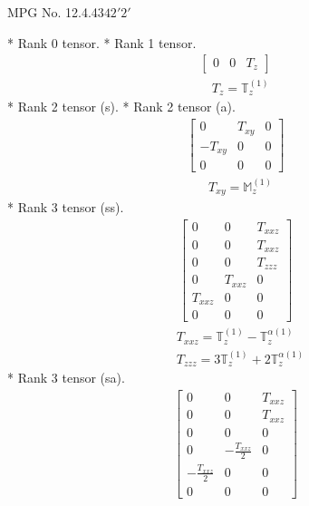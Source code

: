 \documentclass[fleqn,8pt,landscape]{jsarticle}
\begin{document}
\setcounter{MaxMatrixCols}{32}

\renewcommand{\tablename}{Table~}
\renewcommand{\figurename}{Figure~}
\begin{center}
\LARGE
MPG No. 12.4.43\quad$42'2'$
\end{center}
* Rank 0 tensor.
* Rank 1 tensor.
\begin{align*}
\begin{bmatrix} 0 & 0 & T_{z} \end{bmatrix}
\end{align*}
\begin{align*}
& T_{z} = \mathbb{T}_{z}^{(1)}
\end{align*}
* Rank 2 tensor (s).
* Rank 2 tensor (a).
\begin{align*}
\begin{bmatrix} 0 & T_{xy} & 0 \\ - T_{xy} & 0 & 0 \\ 0 & 0 & 0 \end{bmatrix}
\end{align*}
\begin{align*}
& T_{xy} = \mathbb{M}_{z}^{(1)}
\end{align*}
* Rank 3 tensor (ss).
\begin{align*}
\begin{bmatrix} 0 & 0 & T_{xxz} \\ 0 & 0 & T_{xxz} \\ 0 & 0 & T_{zzz} \\ 0 & T_{xxz} & 0 \\ T_{xxz} & 0 & 0 \\ 0 & 0 & 0 \end{bmatrix}
\end{align*}
\begin{align*}
& T_{xxz} = \mathbb{T}_{z}^{(1)} - \mathbb{T}_{z}^{\alpha(1)} \\
& T_{zzz} = 3 \mathbb{T}_{z}^{(1)} + 2 \mathbb{T}_{z}^{\alpha(1)}
\end{align*}
* Rank 3 tensor (sa).
\begin{align*}
\begin{bmatrix} 0 & 0 & T_{xxz} \\ 0 & 0 & T_{xxz} \\ 0 & 0 & 0 \\ 0 & - \frac{T_{xxz}}{2} & 0 \\ - \frac{T_{xxz}}{2} & 0 & 0 \\ 0 & 0 & 0 \end{bmatrix}
\end{align*}
\end{document}
